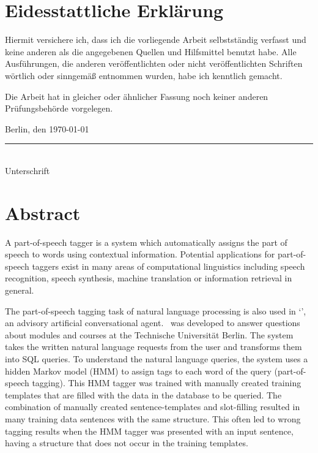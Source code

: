 \BlankPage

\chapter*{Eidesstattliche Erklärung}
Hiermit versichere ich, dass ich die vorliegende Arbeit selbstständig verfasst und keine anderen als die angegebenen Quellen und Hilfsmittel benutzt habe. Alle Ausführungen, die anderen veröffentlichten oder nicht veröffentlichten Schriften wörtlich oder sinngemäß entnommen wurden, habe ich kenntlich gemacht.

Die Arbeit hat in gleicher oder ähnlicher Fassung noch keiner anderen Prüfungsbehörde vorgelegen.
\vspace{10mm}

Berlin, den \today\\

\vspace{1cm}
\rule{.5\textwidth}{.5pt}\\
Unterschrift

\BlankPage

\chapter*{Abstract}
A part-of-speech tagger is a system which automatically assigns the part of speech to words using contextual information. Potential applications for part-of-speech taggers exist in many areas of computational linguistics including speech recognition, speech synthesis, machine translation or information retrieval in general.

The part-of-speech tagging task of natural language processing is also used in `\Alex', an advisory artificial conversational agent. \Alex\ was developed to answer questions about modules and courses at the Technische Universität Berlin. The system takes the written natural language requests from the user and transforms them into SQL queries. To understand the natural language queries, the system uses a hidden Markov model (HMM) to assign tags to each word of the query (part-of-speech tagging). This HMM tagger was trained with manually created training templates that are filled with the data in the database to be queried. The combination of manually created sentence-templates and slot-filling resulted in many training data sentences with the same structure. This often led to wrong tagging results when the HMM tagger was presented with an input sentence, having a structure that does not occur in the training templates.

